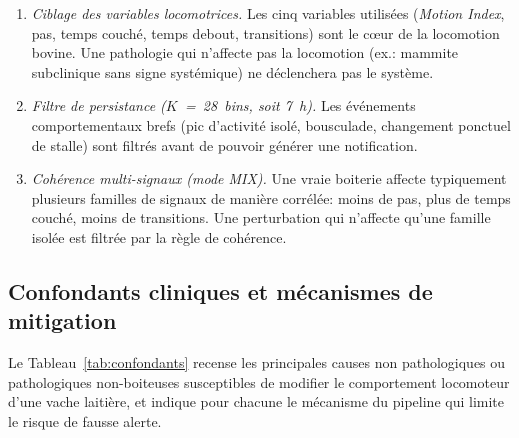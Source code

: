\begin{enumerate}
    \item \textit{Ciblage des variables locomotrices.} Les cinq variables utilisées
    (\textit{Motion Index}, pas, temps couché, temps debout, transitions) sont le cœur de
    la locomotion bovine. Une pathologie qui n'affecte pas la locomotion
    (ex.: mammite subclinique sans signe systémique) ne déclenchera pas le système.
    \item \textit{Filtre de persistance ($K$~=~28~bins, soit 7~h).} Les événements
    comportementaux brefs (pic d'activité isolé, bousculade, changement ponctuel de
    stalle) sont filtrés avant de pouvoir générer une notification.
    \item \textit{Cohérence multi-signaux (mode MIX).} Une vraie boiterie affecte
    typiquement plusieurs familles de signaux de manière corrélée: moins de pas,
    plus de temps couché, moins de transitions. Une perturbation qui n'affecte qu'une
    famille isolée est filtrée par la règle de cohérence.
\end{enumerate}

\subsection{Confondants cliniques et mécanismes de mitigation}

Le Tableau~\ref{tab:confondants} recense les principales causes non pathologiques ou
pathologiques non-boiteuses susceptibles de modifier le comportement locomoteur d'une
vache laitière, et indique pour chacune le mécanisme du pipeline qui limite le risque
de fausse alerte.


